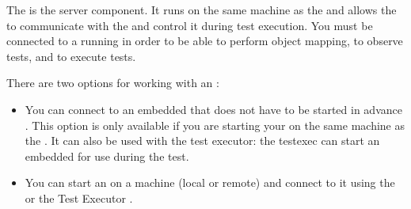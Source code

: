 \label{Agent}

The \gdagent{} is the server component. It runs on the same machine as the \gdaut{} and allows the \ite{} to communicate with the \gdaut{} and control it during test execution. 
You must be connected to a running \gdagent{} in order to be able to perform object mapping, to observe tests, and to execute tests. 

There are two options for working with an \gdagent{}:

\begin{itemize}
\item You can connect to an embedded \gdagent{} that does not have to be started in advance . This option is only available if you are starting your \gdaut{} on the same machine as the \ite{}. It can also be used with the test executor: the testexec can start an embedded \gdagent{} for use during the test.
\item You can start an \gdagent{} on a machine (local or remote) and connect to it using the \ite{} or the Test Executor .
\end{itemize}

